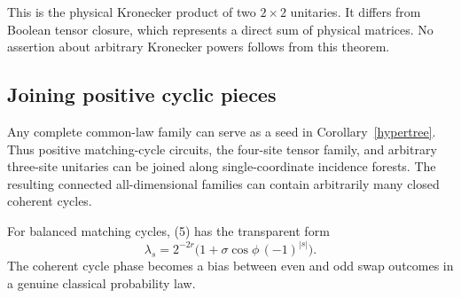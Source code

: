 This is the physical Kronecker product of two $2\times2$ unitaries. It differs from Boolean tensor closure, which represents a direct sum of physical matrices. No assertion about arbitrary Kronecker powers follows from this theorem.

\subsection{Joining positive cyclic pieces}
Any complete common-law family can serve as a seed in Corollary~\ref{hypertree}. Thus positive matching-cycle circuits, the four-site tensor family, and arbitrary three-site unitaries can be joined along single-coordinate incidence forests. The resulting connected all-dimensional families can contain arbitrarily many closed coherent cycles.

For balanced matching cycles, (5) has the transparent form
\[
\lambda_s=2^{-2r}\bigl(1+\sigma\cos\phi\,(-1)^{|s|}\bigr).
\]
The coherent cycle phase becomes a bias between even and odd swap outcomes in a genuine classical probability law.

